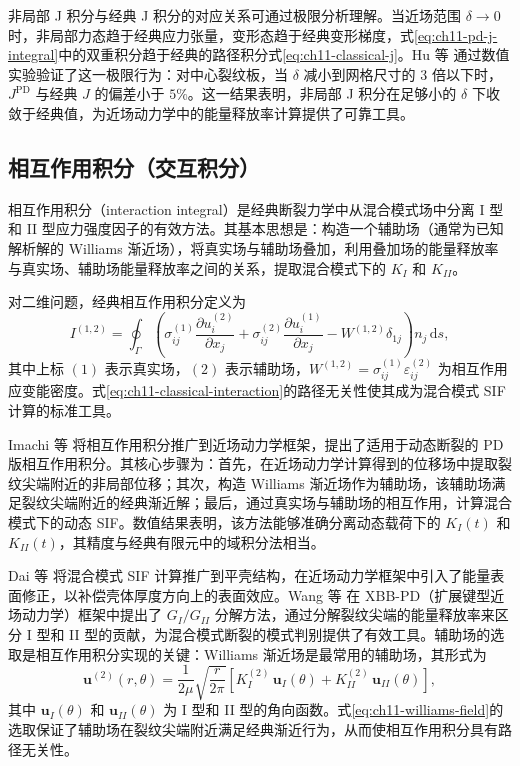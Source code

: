 非局部 J 积分与经典 J 积分的对应关系可通过极限分析理解。当近场范围 $\delta\to 0$ 时，非局部力态趋于经典应力张量，变形态趋于经典变形梯度，式\eqref{eq:ch11-pd-j-integral}中的双重积分趋于经典的路径积分式\eqref{eq:ch11-classical-j}。Hu 等 \cite{HuHaBobaruSilling2012} 通过数值实验验证了这一极限行为：对中心裂纹板，当 $\delta$ 减小到网格尺寸的 3 倍以下时，$J^{\mathrm{PD}}$ 与经典 $J$ 的偏差小于 $5\%$。这一结果表明，非局部 J 积分在足够小的 $\delta$ 下收敛于经典值，为近场动力学中的能量释放率计算提供了可靠工具。

\subsection{相互作用积分（交互积分）}\label{sec:ch11-interaction-integral}

相互作用积分（interaction integral）是经典断裂力学中从混合模式场中分离 I 型和 II 型应力强度因子的有效方法。其基本思想是：构造一个辅助场（通常为已知解析解的 Williams 渐近场），将真实场与辅助场叠加，利用叠加场的能量释放率与真实场、辅助场能量释放率之间的关系，提取混合模式下的 $K_I$ 和 $K_{II}$。

对二维问题，经典相互作用积分定义为
\begin{equation}
I^{(1,2)}=\oint_{\Gamma}\left(\sigma_{ij}^{(1)}\frac{\partial u_i^{(2)}}{\partial x_j}+\sigma_{ij}^{(2)}\frac{\partial u_i^{(1)}}{\partial x_j}-W^{(1,2)}\delta_{1j}\right)n_j\,\mathrm{d}s,
\label{eq:ch11-classical-interaction}
\end{equation}
其中上标 $(1)$ 表示真实场，$(2)$ 表示辅助场，$W^{(1,2)}=\sigma_{ij}^{(1)}\varepsilon_{ij}^{(2)}$ 为相互作用应变能密度。式\eqref{eq:ch11-classical-interaction}的路径无关性使其成为混合模式 SIF 计算的标准工具。

Imachi 等 \cite{Imachi2018} 将相互作用积分推广到近场动力学框架，提出了适用于动态断裂的 PD 版相互作用积分。其核心步骤为：首先，在近场动力学计算得到的位移场中提取裂纹尖端附近的非局部位移；其次，构造 Williams 渐近场作为辅助场，该辅助场满足裂纹尖端附近的经典渐近解；最后，通过真实场与辅助场的相互作用，计算混合模式下的动态 SIF。数值结果表明，该方法能够准确分离动态载荷下的 $K_I(t)$ 和 $K_{II}(t)$，其精度与经典有限元中的域积分法相当。

Dai 等 \cite{Dai2021} 将混合模式 SIF 计算推广到平壳结构，在近场动力学框架中引入了能量表面修正，以补偿壳体厚度方向上的表面效应。Wang 等 \cite{Wang2023} 在 XBB-PD（扩展键型近场动力学）框架中提出了 $G_I/G_{II}$ 分解方法，通过分解裂纹尖端的能量释放率来区分 I 型和 II 型的贡献，为混合模式断裂的模式判别提供了有效工具。辅助场的选取是相互作用积分实现的关键：Williams 渐近场是最常用的辅助场，其形式为
\begin{equation}
\mathbf{u}^{(2)}(r,\theta)=\frac{1}{2\mu}\sqrt{\frac{r}{2\pi}}\left[K_I^{(2)}\,\mathbf{u}_I(\theta)+K_{II}^{(2)}\,\mathbf{u}_{II}(\theta)\right],
\label{eq:ch11-williams-field}
\end{equation}
其中 $\mathbf{u}_I(\theta)$ 和 $\mathbf{u}_{II}(\theta)$ 为 I 型和 II 型的角向函数。式\eqref{eq:ch11-williams-field}的选取保证了辅助场在裂纹尖端附近满足经典渐近行为，从而使相互作用积分具有路径无关性。

